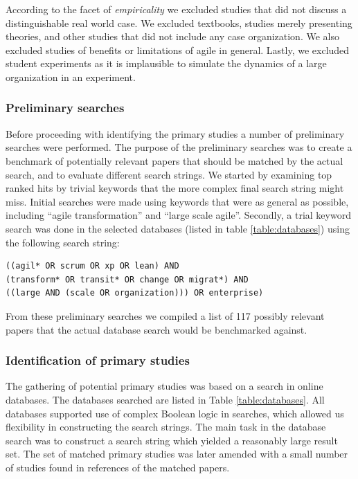 \documentclass[preprint,authoryear,12pt]{elsarticle}
\begin{document}

According to the facet of \emph{empiricality} we excluded studies that did not
discuss a distinguishable real world case. We excluded textbooks, studies merely
presenting theories, and other studies that did not include any case
organization. We also excluded studies of benefits or limitations of agile in
general. Lastly, we excluded student experiments as it is implausible to
simulate the dynamics of a large organization in an experiment.


\subsubsection{Preliminary searches}

Before proceeding with identifying the primary studies a number of preliminary
searches were performed. The purpose of the preliminary searches was to create a
benchmark of potentially relevant papers that should be matched by the actual
search, and to evaluate different search strings. We started by examining top
ranked hits by trivial keywords that the more complex final search string might
miss. Initial searches were made using keywords that were as general as
possible, including ``agile transformation'' and ``large scale agile''.
Secondly, a trial keyword search was done in the selected databases (listed in
table \ref{table:databases}) using the following search string:

\begin{verbatim}
((agil* OR scrum OR xp OR lean) AND
(transform* OR transit* OR change OR migrat*) AND
((large AND (scale OR organization))) OR enterprise)
\end{verbatim}

From these preliminary searches we compiled a list of 117 possibly relevant
papers that the actual database search would be benchmarked against.


\subsubsection{Identification of primary studies}

The gathering of potential primary studies was based on a search in online
databases. The databases searched are listed in Table \ref{table:databases}. All
databases supported use of complex Boolean logic in searches, which allowed us
flexibility in constructing the search strings. The main task in the database
search was to construct a search string which yielded a reasonably large result
set. The set of matched primary studies was later amended with a small number
of studies found in references of the matched papers.
\end{document}

